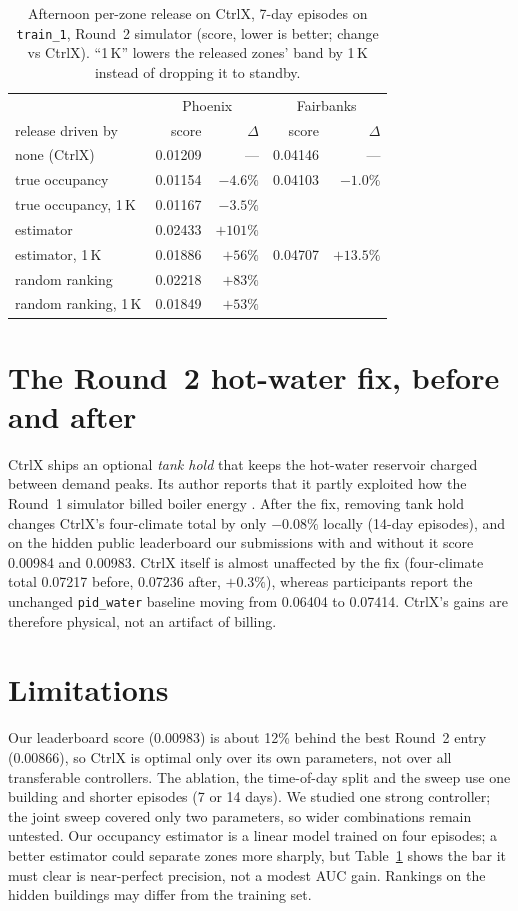 \documentclass{article}
\begin{document}
\begin{table}[h]
\centering\small
\caption{Afternoon per-zone release on CtrlX, 7-day episodes on \texttt{train\_1}, Round~2 simulator (score, lower is better; change vs CtrlX). ``1\,K'' lowers the released zones' band by 1\,K instead of dropping it to standby.}\label{tab:occ}
\begin{tabular}{lrrrr}
\toprule
& \multicolumn{2}{c}{Phoenix} & \multicolumn{2}{c}{Fairbanks}\\
release driven by & score & $\Delta$ & score & $\Delta$\\
\midrule
none (CtrlX) & 0.01209 & --- & 0.04146 & ---\\
true occupancy & 0.01154 & $-4.6\%$ & 0.04103 & $-1.0\%$\\
true occupancy, 1\,K & 0.01167 & $-3.5\%$ & & \\
estimator & 0.02433 & $+101\%$ & & \\
estimator, 1\,K & 0.01886 & $+56\%$ & 0.04707 & $+13.5\%$\\
random ranking & 0.02218 & $+83\%$ & & \\
random ranking, 1\,K & 0.01849 & $+53\%$ & & \\
\bottomrule
\end{tabular}
\end{table}

\section{The Round~2 hot-water fix, before and after}\label{sec:accounting}
CtrlX ships an optional \emph{tank hold} that keeps the hot-water reservoir charged between demand peaks. Its author reports that it partly exploited how the Round~1 simulator billed boiler energy \cite{morev2026}. After the fix, removing tank hold changes CtrlX's four-climate total by only $-0.08\%$ locally (14-day episodes), and on the hidden public leaderboard our submissions with and without it score 0.00984 and 0.00983. CtrlX itself is almost unaffected by the fix (four-climate total 0.07217 before, 0.07236 after, $+0.3\%$), whereas participants report the unchanged \texttt{pid\_water} baseline moving from 0.06404 to 0.07414. CtrlX's gains are therefore physical, not an artifact of billing.

\section{Limitations}
Our leaderboard score (0.00983) is about 12\% behind the best Round~2 entry (0.00866), so CtrlX is optimal only over its own parameters, not over all transferable controllers. The ablation, the time-of-day split and the sweep use one building and shorter episodes (7 or 14 days). We studied one strong controller; the joint sweep covered only two parameters, so wider combinations remain untested. Our occupancy estimator is a linear model trained on four episodes; a better estimator could separate zones more sharply, but Table~\ref{tab:occ} shows the bar it must clear is near-perfect precision, not a modest AUC gain. Rankings on the hidden buildings may differ from the training set.
\end{document}
